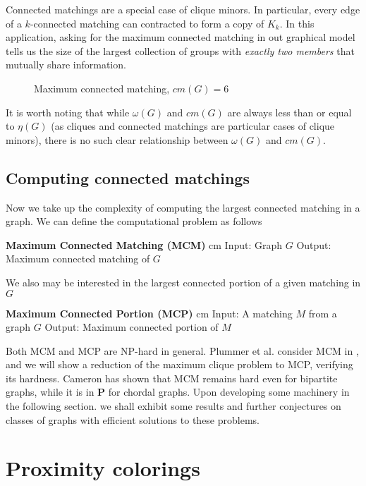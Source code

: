 \documentclass[12pt]{article}
\theoremstyle{definition}
\begin{document}
Connected matchings are a special case of clique minors.  In particular, every edge of a $k$-connected matching can contracted to form a copy of $K_k$.  In this application, asking for the maximum connected matching in out graphical model tells us the size of the largest collection of groups with \textit{exactly two members} that mutually share information. 
\begin{figure}[h]
\begin{center}\end{center}
\caption{Maximum connected matching, $cm(G) = 6$}
\label{soc_net_conmatch}
\end{figure} 
It is worth noting that while $\omega(G)$ and $cm(G)$ are always less than or equal to $\eta(G)$ (as cliques and connected matchings are particular cases of clique minors), there is no such clear relationship between $\omega(G)$ and $cm(G)$.

\subsection{Computing connected matchings}
Now we take up the complexity of computing the largest connected matching in a graph.  We can define the computational problem as follows
{\linespread{1.2}\begin{framed}
  \noindent \textbf{Maximum Connected Matching (MCM)}
   cm 
  \noindent Input: Graph $G$
  \newline Output: Maximum connected matching of $G$
 \end{framed}
We also may be interested in the largest connected portion of a given matching in $G$
 \begin{framed}
  \noindent \textbf{Maximum Connected Portion (MCP)}
   cm 
  \noindent Input: A matching $M$ from a graph $G$
  \newline Output: Maximum connected portion of $M$
\end{framed}}
Both MCM and MCP are NP-hard in general.  Plummer et al. consider MCM in \cite{Spec_case}, and we will show a reduction of the maximum clique problem to MCP, verifying its hardness.  Cameron \cite{K_Cam} has shown that MCM remains hard even for bipartite graphs, while it is in $\mathbf{P}$ for chordal graphs.  Upon developing some machinery in the following section. we shall exhibit some results and further conjectures on classes of graphs with efficient solutions to these problems.

\section{Proximity colorings}
\end{document}
